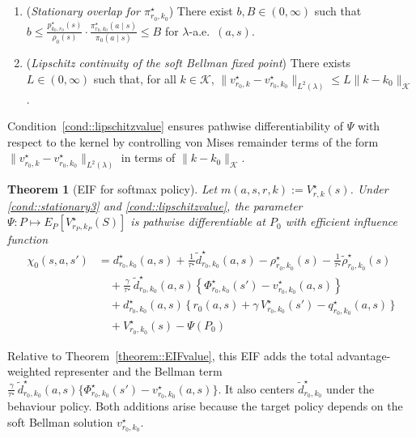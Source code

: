 \documentclass[12pt]{article}
\theoremstyle{plain}
\newtheorem{theorem}{Theorem}
\begin{document}
\begin{enumerate}[label=\textbf{(D\arabic*)}, ref=D\arabic*, resume=condexample]
    \item (\textit{Stationary overlap for $\pi_{r_0, k_0}^\star$}) There exist $b, B \in (0,\infty)$ such that $b \le \frac{p_{k_0, r_0}^{\star}(s)}{\rho_0(s)} \cdot \frac{\pi_{r_0, k_0}^\star(a \mid s)}{\pi_0(a \mid s)} \le B$ for $\lambda$-a.e.\ $(a,s)$. \label{cond::stationary3}
    \item (\textit{Lipschitz continuity of the soft Bellman fixed point}) There exists $L\in (0,\infty)$ such that, for all $k \in \mathcal{K}$, $\|v_{r_0,k}^\star - v_{r_0, k_0}^\star\|_{L^2(\lambda)} \le L \|k - k_0\|_{\mathcal{K}}$. \label{cond::lipschitzvalue}
\end{enumerate}

Condition~\ref{cond::lipschitzvalue} ensures pathwise differentiability of
$\Psi$ with respect to the kernel by controlling von Mises remainder terms of
the form $\|v_{r_0,k}^\star-v_{r_0,k_0}^\star\|_{L^2(\lambda)}$ in terms of
$\|k-k_0\|_{\mathcal K}$.
 
\begingroup
 
 
\begin{theorem}[EIF for softmax policy]
\label{theorem::EIFsoftmax}
Let $m(a,s,r,k) := V_{r,k}^\star(s)$. Under \ref{cond::stationary3} and \ref{cond::lipschitzvalue}, the parameter $\Psi: P \mapsto E_P[V_{r_P,k_P}^\star(S)]$ is pathwise differentiable at $P_0$ with efficient influence function
\begin{align*}
   \chi_0(s,a,s')
&= d_{r_0,k_0}^\star(a,s)
   +\frac{1}{\tau^\star}\widetilde d_{r_0,k_0}^\star(a,s)
   -\rho_{r_0,k_0}^\star(s)
   -\frac{1}{\tau^\star}\widetilde\rho_{r_0,k_0}^\star(s) \\[4pt]
& \quad + \frac{\gamma}{\tau^\star}\,\widetilde{d}_{r_0,k_0}^\star(a,s)
   \left\{\Phi_{r_0,k_0}^\star(s')-v_{r_0,k_0}^\star(a,s)\right\} \\[4pt]
& \quad + d_{r_0,k_0}^\star(a,s)\,\Big\{\,r_0(a,s) + \gamma\,V_{r_0,k_0}^{\star}(s') - q_{r_0,k_0}^\star(a,s)\,\Big\} \\[4pt]
& \quad + V_{r_0,k_0}^\star(s) - \Psi(P_0)
\end{align*}

\end{theorem}
\endgroup
\noindent Relative to Theorem~\ref{theorem::EIFvalue}, this EIF adds the
total advantage-weighted representer and the Bellman term
\(\tfrac{\gamma}{\tau^\star}\,\widetilde{d}_{r_0,k_0}^\star(a,s)
\{\Phi_{r_0,k_0}^\star(s') - v_{r_0,k_0}^\star(a,s)\}\).
It also centers \(\widetilde d_{r_0,k_0}^\star\) under the behaviour policy.
Both additions arise because the target policy depends on the soft Bellman
solution \(v_{r_0,k_0}^\star\).
\end{document}
